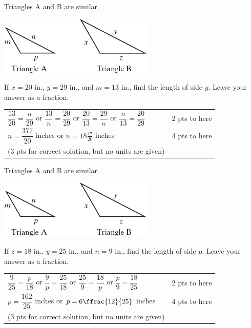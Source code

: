 {
	Triangles A and B are similar.\begin{center}\includegraphics{fig100-09.png}\end{center} If $x=20$ in., $y=29$ in., and $m=13$ in., find the length of side $y$. Leave your answer as a fraction.
}
{
	\begin{tabular}{l r}
	$\dfrac{13}{20}=\dfrac{n}{29}$ or 
	$\dfrac{13}{n}=\dfrac{20}{29}$ or
	$\dfrac{20}{13}=\dfrac{29}{n}$ or 
	$\dfrac{n}{13}=\dfrac{20}{29}$ & 2 pts to here\\
	$n=\dfrac{377}{20}$ inches or $n= 18 \frac{17}{20}$ inches & 4 pts to here \\
	(3 pts for correct solution, but no units are given)
	\end{tabular}
}

{
	Triangles A and B are similar.\begin{center}\includegraphics{fig100-09.png}\end{center} If $z=18$ in., $y=25$ in., and $n=9$ in., find the length of side $p$. Leave your answer as a fraction.
}
{
	\begin{tabular}{l r}
	$\dfrac{9}{25}=\dfrac{p}{18}$ or
	$\dfrac{9}{p}=\dfrac{25}{18}$ or 
	$\dfrac{25}{9}=\dfrac{18}{p}$ or 
	$\dfrac{p}{9}=\dfrac{18}{25}$ & 2 pts to here\\
	$p=\dfrac{162}{25}$ inches or $p= 6 \ffrac{12}{25}$ inches & 4 pts to here \\
	(3 pts for correct solution, but no units are given)
	\end{tabular}
}
